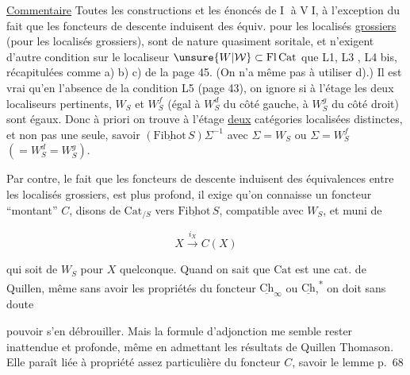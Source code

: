 \uline{Commentaire} Toutes les constructions et les énoncés de \textcircled{I} à \textcircled{VI}, à l'exception du fait que les foncteurs de descente induisent des équiv. pour les localisés \uline{grossiers} (pour  les localisés grossiers),  sont de nature quasiment soritale, et n'exigent d'autre  condition sur le localiseur  $\unsure{W|\mathcal{W}}\subset\mathrm{Fl}\,\mathrm{Cat}$ que  L1, L3 , L4 bis, récapitulées comme a) b) c) de la page 45. (On n'a même pas à utiliser d).) Il est vrai qu'en l'absence de la condition L5 (page 43), on ignore si à l'étage les deux localiseurs pertinents, $W_S$ et $W_S^f$ (égal à $W_S^d$ du côté gauche, à $W_S^g$ du côté droit) sont égaux. Donc à priori on trouve à l'étage \uline{deux} catégories localisées  distinctes, et non pas une seule, savoir $(\underline{\mathrm{Fibhot}}\,S)\Sigma^{-1}$ avec $\Sigma=W_S$ ou $\Sigma=W_S^f$ $(=W_S^d=W_S^g)$.

Par contre, le fait que les foncteurs de descente induisent des équivalences entre les localisés grossiers, est plus profond, il exige   qu'on connaisse un foncteur ``montant'' $C$, disons de $\mathrm{Cat}_{/S}$ vers $\underline{\mathrm{Fibhot}}\,S$,  compatible avec $W_S$, et muni de

\[
X\xrightarrow{i_X}C(X)
\]

qui soit de $W_S$ pour $X$ quelconque. Quand on sait que $\mathrm{Cat}$ est une cat. de Quillen, même sans avoir les propriétés du foncteur $\underline{\mathrm{Ch}}_\infty$ ou $\underline{\mathrm{Ch}}$,\textsuperscript{*} on doit sans doute


pouvoir s'en débrouiller. Mais la formule d'adjonction me semble rester inattendue et profonde, même en admettant les résultats de Quillen  Thomason. Elle paraît liée  à  propriété assez particulière du foncteur $C$, savoir le lemme p.~68


